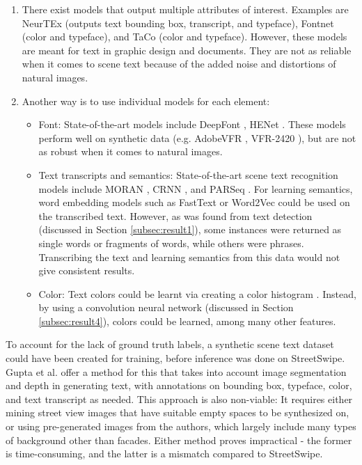 \begin{enumerate}
    \item There exist models that output multiple attributes of interest. Examples are NeurTEx \cite{aggarwal_neurtex_2022} (outputs text bounding box, transcript, and typeface), Fontnet \cite{s_fontnet_2021} (color and typeface), and TaCo \cite{nie_taco_2022} (color and typeface). However, these models are meant for text in graphic design and documents. They are not as reliable when it comes to scene text because of the added noise and distortions of natural images.
    \item Another way is to use individual models for each element:
    \begin{itemize}
        \item Font: State-of-the-art models include DeepFont \cite{wang_deepfont_2015}, HENet \cite{chen_henet_2021}. These models perform well on synthetic data (e.g. AdobeVFR \cite{wang_deepfont_2015}, VFR-2420 \cite{chen_large-scale_2014}), but are not as robust when it comes to natural images.
        \item Text transcripts and semantics: State-of-the-art scene text recognition models include MORAN \cite{luo_multi-object_2019}, CRNN \cite{shi_end2end_2015}, and PARSeq \cite{bautista_scene_2022}. For learning semantics, word embedding models such as FastText \cite{bojanowski_enriching_2017} or Word2Vec \cite{mikolov_efficient_2013} could be used on the transcribed text. However, as was found from text detection (discussed in Section \ref{subsec:result1}), some instances were returned as single words or fragments of words, while others were phrases. Transcribing the text and learning semantics from this data would not give consistent results.
        \item Color: Text colors could be learnt via creating a color histogram \cite{srivastava_review_2015}. Instead, by using a convolution neural network (discussed in Section \ref{subsec:result4}), colors could be learned, among many other features.
    \end{itemize}
\end{enumerate}

To account for the lack of ground truth labels, a synthetic scene text dataset could have been created for training, before inference was done on StreetSwipe. Gupta et al. \cite{gupta_synt_2016} offer a method for this that takes into account image segmentation and depth in generating text, with annotations on bounding box, typeface, color, and text transcript as needed. This approach is also non-viable: It requires either mining street view images that have suitable empty spaces to be synthesized on, or using pre-generated images from the authors, which largely include many types of background other than facades. Either method proves impractical - the former is time-consuming, and the latter is a mismatch compared to StreetSwipe.

